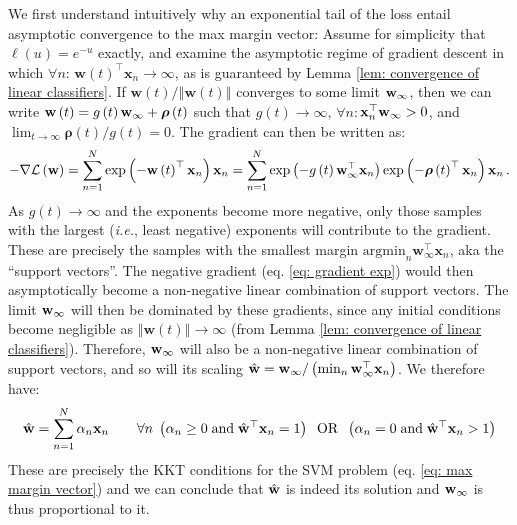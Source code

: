 \documentclass[twoside,11pt,english]{article}
\begin{document}
We first understand intuitively why an exponential tail of the loss
entail asymptotic convergence to the max margin vector: Assume for
simplicity that $\ell\left(u\right)=e^{-u}$ exactly, and examine
the asymptotic regime of gradient descent in which $\forall n:\,\mathbf{w}\left(t\right)^{\top}\mathbf{x}_{n}\rightarrow\infty$,
as is guaranteed by Lemma \ref{lem: convergence of linear classifiers}.
If $\mathbf{w}\left(t\right)/\left\Vert \mathbf{w}\left(t\right)\right\Vert $
converges to some limit $\mathbf{w}_{\infty}$, then we can write $\mathbf{w}\left(t\right)=g\left(t\right)\mathbf{w}_{\infty}+\boldsymbol{\rho}\left(t\right)$
such that $g\left(t\right)\rightarrow\infty$, $\forall n:$$\mathbf{x}_{n}^{\top}\mathbf{w}_{\infty}>0$,
and $\lim_{t\rightarrow\infty}\boldsymbol{\rho}\left(t\right)/g\left(t\right)=0$.
The gradient can then be written as: 
\begin{equation}
-\nabla\mathcal{L}\left(\mathbf{w}\right)=\sum_{n=1}^{N}\exp\left(-\mathbf{w}\left(t\right)^{\top}\mathbf{x}_{n}\right)\mathbf{x}_{n}=\sum_{n=1}^{N}\exp\left(-g\left(t\right)\mathbf{w}_{\infty}^{\top}\mathbf{x}_{n}\right)\exp\left(-\boldsymbol{\rho}\left(t\right)^{\top}\mathbf{x}_{n}\right)\mathbf{x}_{n}\,.\label{eq: gradient exp}
\end{equation}
As $g(t)\rightarrow\infty$ and the exponents become more negative,
only those samples with the largest (\emph{i.e.}, least negative)
exponents will contribute to the gradient. These are precisely the
samples with the smallest margin $\mathrm{argmin}_{n}\mathbf{w}_{\infty}^{\top}\mathbf{x}_{n}$,
aka the ``support vectors''. The negative gradient (eq. \ref{eq: gradient exp})
would then asymptotically become a non-negative linear combination
of support vectors. The limit $\mathbf{w}_{\infty}$ will then be dominated by
these gradients, since any initial conditions become negligible as
$\left\Vert \mathbf{w}\left(t\right)\right\Vert \rightarrow\infty$
(from Lemma \ref{lem: convergence of linear classifiers}). Therefore,
$\mathbf{w}_{\infty}$ will also be a non-negative linear combination of support
vectors, and so will its scaling $\hat{\mathbf{w}}=\mathbf{w}_{\infty}/\left(\min_{n}\mathbf{w}_{\infty}^{\top}\mathbf{x}_{n}\right)$.
We therefore have: 
\begin{equation}
\hat{\mathbf{w}}=\sum_{n=1}^{N}\alpha_{n}\mathbf{x}_{n}\quad\quad\forall n\;\left(\alpha_{n}\geq0\;\textrm{and}\;\hat{\mathbf{w}}^{\top}\mathbf{x}_{n}=1\right)\;\;\textrm{OR}\;\;\left(\alpha_{n}=0\;\textrm{and}\;\hat{\mathbf{w}}^{\top}\mathbf{x}_{n}>1\right)\label{eq:kkt}
\end{equation}
These are precisely the KKT conditions for the SVM problem (eq. \ref{eq: max margin vector})
and we can conclude that $\hat{\mathbf{w}}$ is indeed its solution and $\mathbf{w}_{\infty}$
is thus proportional to it.
\end{document}
